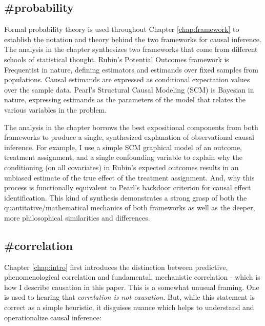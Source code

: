 \documentclass[./main.tex]{subfiles}
\begin{document}
\subsection*{\textbf{\#probability}}
\label{hc:probability}

Formal probability theory is used throughout Chapter \ref{chap:framework} to establish the notation and theory behind the two frameworks for causal inference. The analysis in the chapter synthesizes two frameworks that come from different schools of statistical thought. Rubin's Potential Outcomes framework is Frequentist in nature, defining estimators and estimands over fixed samples from populations. Causal estimands are expressed as conditional expectation values over the sample data. Pearl's Structural Causal Modeling (SCM) is Bayesian in nature, expressing estimands as the parameters of the model that relates the various variables in the problem.

\vspace{\baselineskip}

The analysis in the chapter borrows the best expositional components from both frameworks to produce a single, synthesized explanation of observational causal inference. For example, I use a simple SCM graphical model of an outcome, treatment assignment, and a single confounding variable to explain why the conditioning (on all covariates) in Rubin's expected outcomes results in an unbiased estimate of the true effect of the treatment assignment. And, why this process is functionally equivalent to Pearl's backdoor criterion for causal effect identification. This kind of synthesis demonstrates a strong grasp of both the quantitative/mathematical mechanics of both frameworks as well as the deeper, more philosophical similarities and differences.


\subsection*{\textbf{\#correlation}}
\label{hc:correlation}

Chapter \ref{chap:intro} first introduces the distinction between predictive, phenomenological correlation and fundamental, mechanistic correlation - which is how I describe causation in this paper. This is a somewhat unusual framing. One is used to hearing that \textit{correlation is not causation}. But, while this statement is correct as a simple heuristic, it disguises nuance which helps to understand and operationalize causal inference:
\end{document}
